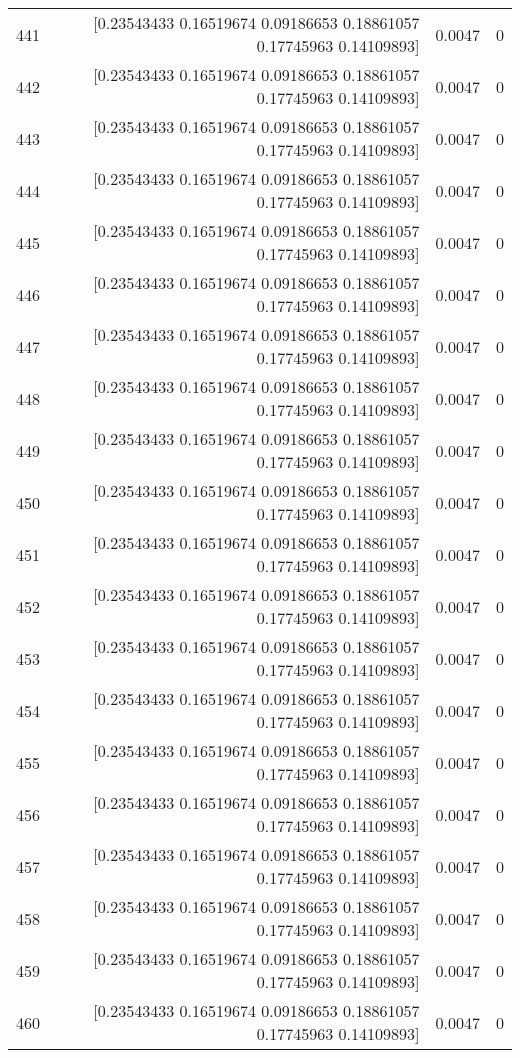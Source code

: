 \begin{longtable}{lrrr}
441 & [0.23543433 0.16519674 0.09186653 0.18861057 0.17745963 0.14109893] & 0.0047 & 0 \\
442 & [0.23543433 0.16519674 0.09186653 0.18861057 0.17745963 0.14109893] & 0.0047 & 0 \\
443 & [0.23543433 0.16519674 0.09186653 0.18861057 0.17745963 0.14109893] & 0.0047 & 0 \\
444 & [0.23543433 0.16519674 0.09186653 0.18861057 0.17745963 0.14109893] & 0.0047 & 0 \\
445 & [0.23543433 0.16519674 0.09186653 0.18861057 0.17745963 0.14109893] & 0.0047 & 0 \\
446 & [0.23543433 0.16519674 0.09186653 0.18861057 0.17745963 0.14109893] & 0.0047 & 0 \\
447 & [0.23543433 0.16519674 0.09186653 0.18861057 0.17745963 0.14109893] & 0.0047 & 0 \\
448 & [0.23543433 0.16519674 0.09186653 0.18861057 0.17745963 0.14109893] & 0.0047 & 0 \\
449 & [0.23543433 0.16519674 0.09186653 0.18861057 0.17745963 0.14109893] & 0.0047 & 0 \\
450 & [0.23543433 0.16519674 0.09186653 0.18861057 0.17745963 0.14109893] & 0.0047 & 0 \\
451 & [0.23543433 0.16519674 0.09186653 0.18861057 0.17745963 0.14109893] & 0.0047 & 0 \\
452 & [0.23543433 0.16519674 0.09186653 0.18861057 0.17745963 0.14109893] & 0.0047 & 0 \\
453 & [0.23543433 0.16519674 0.09186653 0.18861057 0.17745963 0.14109893] & 0.0047 & 0 \\
454 & [0.23543433 0.16519674 0.09186653 0.18861057 0.17745963 0.14109893] & 0.0047 & 0 \\
455 & [0.23543433 0.16519674 0.09186653 0.18861057 0.17745963 0.14109893] & 0.0047 & 0 \\
456 & [0.23543433 0.16519674 0.09186653 0.18861057 0.17745963 0.14109893] & 0.0047 & 0 \\
457 & [0.23543433 0.16519674 0.09186653 0.18861057 0.17745963 0.14109893] & 0.0047 & 0 \\
458 & [0.23543433 0.16519674 0.09186653 0.18861057 0.17745963 0.14109893] & 0.0047 & 0 \\
459 & [0.23543433 0.16519674 0.09186653 0.18861057 0.17745963 0.14109893] & 0.0047 & 0 \\
460 & [0.23543433 0.16519674 0.09186653 0.18861057 0.17745963 0.14109893] & 0.0047 & 0 \\

\end{longtable}
